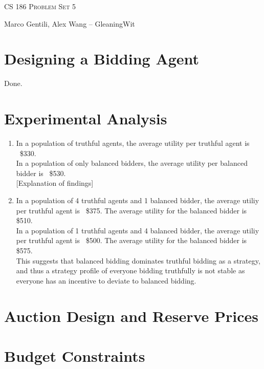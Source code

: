 \documentclass[12pt]{article}
\begin{document}
\thispagestyle{empty}

\begin{center}
{\Large \textsc{CS 186 Problem Set 5}}

\bigskip

Marco Gentili, Alex Wang -- GleaningWit
\end{center}

\section{Designing a Bidding Agent}
Done.

\section{Experimental Analysis}

\begin{enumerate}[label=(\alph*)]
\item In a population of truthful agents, the average utility per truthful agent is ~\$330. \\

In a population of only balanced bidders, the average utility per balanced bidder is ~\$530. \\

[Explanation of findings]

\item In a population of 4 truthful agents and 1 balanced bidder, the average utiliy per truthful agent is ~\$375. The average utility for the balanced bidder is \$510. \\

In a population of 1 truthful agents and 4 balanced bidder, the average utiliy per truthful agent is ~\$500. The average utility for the balanced bidder is \$575. \\

This suggests that balanced bidding dominates truthful bidding as a strategy, and thus a strategy profile of everyone bidding truthfully is not stable as everyone has an incentive to deviate to balanced bidding.

\end{enumerate}

\section{Auction Design and Reserve Prices}

\section{Budget Constraints}
\end{document}

